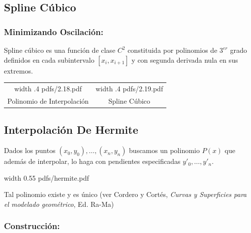 \documentclass[twoside]{report}
\newcommand{\celeste}[1]{\textcolor{cyan}{#1}}
\newcommand{\colocapdf}[2]{\quad\pdfimage width #2 {pdfs/#1.pdf}}
\begin{document}
\subsection{Spline Cúbico}

\subsubsection{Minimizando Oscilación:}

\begin{defi}
Spline cúbico es una función de clase $C^2$ constituida por polinomios de $3^{er}$ grado definidos en cada subintervalo $[x_i,x_{i+1}]$ y con segunda derivada nula en sus extremos.
\end{defi}

\begin{center}
\begin{tabular}{cc}
\colocapdf{2.18}{.4\textwidth} & \colocapdf{2.19}{.4\textwidth}
\\ Polinomio de Interpolación &  Spline Cúbico
\end{tabular}
\end{center}


\subsection{Interpolación De Hermite}

Dados los puntos $(x_0,y_0),\ldots,(x_n,y_n)$ buscamos un polinomio $P(x)$ que además de interpolar, lo haga con pendientes especificadas $y'_0,\ldots,y'_n$.

\begin{center}
\colocapdf{hermite}{0.55\textwidth}
\end{center}

Tal polinomio existe y es único (ver Cordero y Cortés, {\it Curvas y Superficies para el modelado geométrico}, Ed. Ra-Ma)

\subsubsection{Construcción:}
\end{document}
